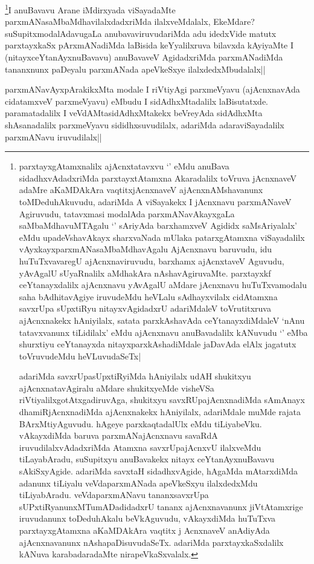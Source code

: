 \begin{artha}
\footnote{parxtayxgAtamxnalilx ajAcnxtatavxvu `\stext' eMdu anuBava sidadhxvAdadxriMda parxtayxtAtamxna Akaradalilx toVruva jAcnxnaveV adaMre aKaMDAkAra vaqtitxjAcnxnaveV ajAcnxnAMshavanunx toMDeduhAkuvudu, adariMda A viSayakekx I jAcnxnavu parxmANaveV Agiruvudu, tatavxmasi modalAda parxmANavAkayxgaLa saMbaMdhavuMTAgalu `\stext' sAriyAda barxhamxveV Agididx saMsAriyalalx' eMdu upadeVshavAkayx sharxvaNada mUlaka patarxgAtamxna viSayadalilx vAyxkayxparxmANasaMbaMdhavAgalu AjAcnxnavu baruvudu, idu huTuTxvavaregU ajAcnxnaviruvudu, barxhamx ajAcnxtaveV Aguvudu, yAvAgalU sUyaRnalilx aMdhakAra nAshavAgiruvaMte. parxtayxkf ceYtanayxdalilx ajAcnxnavu yAvAgalU aMdare jAcnxnavu huTuTxvamodalu saha bAdhitavAgiye iruvudeMdu heVLalu sAdhayxvilalx cidAtamxna savxrUpa sUpxtiRyu nitayxvAgidadxrU adariMdaleV toVrutitxruva ajAcnxnakekx hAniyilalx, satata parxkAshavAda ceYtanayxdiMdaleV `nAnu tatavxvanunx tiLidilalx' eMdu ajAcnxnavu anuBavadalilx kANuvudu `\stext' eMba shurxtiyu ceYtanayxda nitayxparxkAshadiMdale jaDavAda elAlx jagatutx toVruvudeMdu heVLuvudaSeTx|

adariMda savxrUpasUpxtiRyiMda hAniyilalx udAH shukitxyu ajAcnxnatavAgiralu aMdare shukitxyeMde visheVSa riVtiyalilxgotAtxgadiruvAga, shukitxyu savxRUpajAcnxnadiMda sAmAnayx dhamiRjAcnxnadiMda ajAcnxnakekx hAniyilalx, adariMdale muMde rajata BArxMtiyAguvudu. hAgeye parxkaqtadalUlx eMdu tiLiyabeVku. vAkayxdiMda baruva parxmANajAcnxnavu savaRdA iruvudilalxvAdadxriMda Atamxna savxrUpajAcnxvU ilalxveMdu tiLayabAradu, suSupitxyu anuBavakekx nitayx ceYtanAyxnuBavavu sAkiSxyAgide. adariMda savxtaH sidadhxvAgide, hAgaMda mAtarxdiMda adanunx tiLiyalu veVdaparxmANada apeVkeSxyu ilalxdedxMdu tiLiyabAradu. veVdaparxmANavu tananxsavxrUpa sUPxtiRyanunxMTumADadidadxrU tananx ajAcnxnavanunx jiVtAtamxrige iruvudanunx toDeduhAkalu beVkAguvudu, vAkayxdiMda huTuTxva parxtayxgAtamxna aKaMDAkAra vaqtitx j AcnxnaveV anAdiyAda ajAcnxnavanunx nAshapaDisuvudaSeTx. adariMda parxtayxkaSxdalilx kANuva karabadaradaMte nirapeVkaSxvalalx.}I anuBavavu Arane iMdirxyada viSayadaMte parxmANasaMbaMdhavilalxdadxriMda ilalxveMdalalx, EkeMdare? suSupitxmodalAdavugaLa anubavaviruvudariMda adu idedxVide matutx parxtayxkaSx pArxmANadiMda laBisida keYyalilxruva bilavxda kAyiyaMte I (nitayxceYtanAyxnuBavavu) anuBavaveV AgidadxriMda parxmANadiMda tananxnunx paDeyalu parxmANada apeVkeSxye ilalxdedxMbudalalx||
\end{artha}

\begin{artha}
parxmANavAyxpArakikxMta modale I riVtiyAgi parxmeVyavu (ajAcnxnavAda cidatamxveV parxmeVyavu) eMbudu I sidAdhxMtadalilx laBisutatxde. paramatadalilx I veVdAMtasidAdhxMtakekx beVreyAda sidAdhxMta shAsanadalilx parxmeVyavu sididhxsuvudilalx, adariMda adaraviSayadalilx parxmANavu iruvudilalx||
\end{artha}


